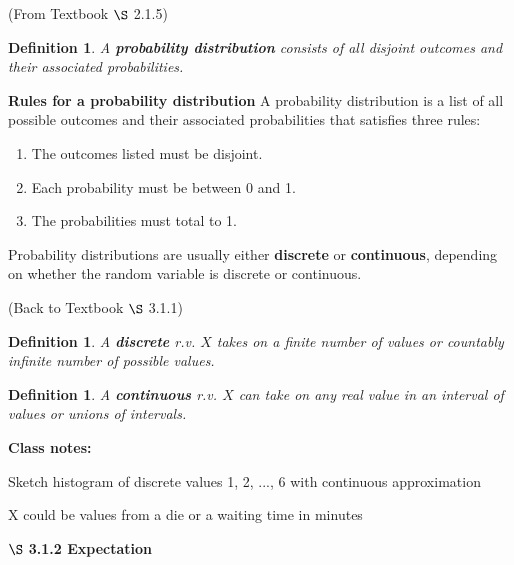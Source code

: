\documentclass[12pt]{amsart}
\newtheorem{definition}[theorem]{Definition}
\begin{document}
{(From Textbook $\S$ 2.1.5)
\begin{definition} A \textbf{probability distribution} consists of all disjoint outcomes and their associated probabilities.
\end{definition}

\textbf{Rules for a probability distribution} \newline
A probability distribution is a list of all possible outcomes and their associated probabilities that satisfies three rules: 
\begin{enumerate}
\setlength{\itemsep}{0mm}
\item The outcomes listed must be disjoint.
\item Each probability must be between 0 and 1.
\item The probabilities must total to 1. \vspace{1mm}
\end{enumerate}

\vspace{0.5cm}

Probability distributions are usually either \textbf{discrete} or \textbf{continuous}, depending on whether the random variable is discrete or continuous.

\vspace{1cm}

(Back to Textbook $\S$ 3.1.1)
\begin{definition} A \textbf{discrete} r.v. $X$ takes on a finite number of values or countably infinite number of possible values.
\end{definition}

\begin{definition} A \textbf{continuous} r.v. $X$ can take on any real value in an interval of values or unions of intervals.\end{definition}


\vspace{2cm}
\color{blue}
\textbf{Class notes:}

Sketch histogram of discrete values 1, 2, ..., 6 with continuous approximation

X could be values from a die or a waiting time in minutes

\color{black}

\newpage

$\S$ \textbf{3.1.2 Expectation}

\vspace{.5cm}

}
\end{document}
